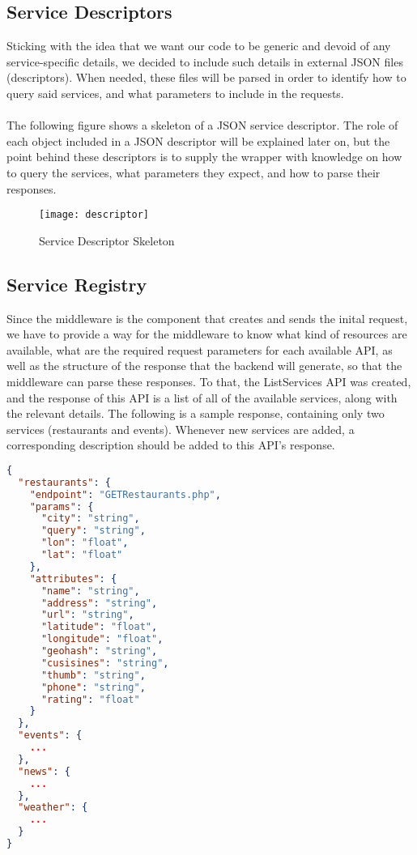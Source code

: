 \subsection{Service Descriptors}
Sticking with the idea that we want our code to be generic and devoid of any service-specific details, we decided to include such details in external JSON files (descriptors). When needed, these files will be parsed in order to identify how to query said services, and what parameters to include in the requests.\\\\
The following figure shows a skeleton of a JSON service descriptor. The role of each object included in a JSON descriptor will be explained later on, but the point behind these descriptors is to supply the wrapper with knowledge on how to query the services, what parameters they expect, and how to parse their responses.
\newpage
\begin{figure}[h]
\centering
\texttt{[image: descriptor]}
\caption{Service Descriptor Skeleton}
\end{figure}
\subsection{Service Registry}
\noindent Since the middleware is the component that creates and sends the inital request, we have to provide a way for the middleware to know what kind of resources are available, what are the required request parameters for each available API, as well as the structure of the response that the backend will generate, so that the middleware can parse these responses. To that, the ListServices API was created, and the response of this API is a list of all of the available services, along with the relevant details. The following is a sample response, containing only two services (restaurants and events). Whenever new services are added, a corresponding description should be added to this API's response.
\newpage
\begin{lstlisting}[language=json,firstnumber=1]
{
  "restaurants": {
    "endpoint": "GETRestaurants.php",
    "params": {
      "city": "string",
      "query": "string",
      "lon": "float",
      "lat": "float"
    },
    "attributes": {
      "name": "string",
      "address": "string",
      "url": "string",
      "latitude": "float",
      "longitude": "float",
      "geohash": "string",
      "cusisines": "string",
      "thumb": "string",
      "phone": "string",
      "rating": "float"
    }
  },
  "events": {
    ...
  },
  "news": {
    ...
  },
  "weather": {
    ...
  }
}
\end{lstlisting}
\pagebreak
